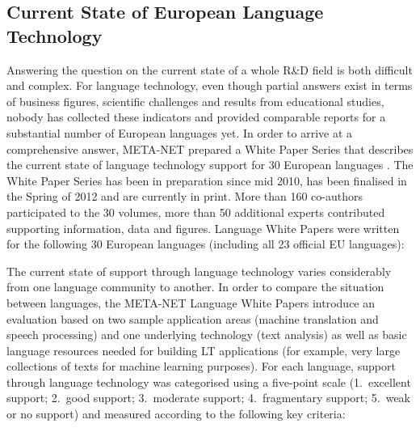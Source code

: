 \documentclass[10pt, plain]{../../metanetpaper}
\begin{document}
\begin{multicols}{2}

\subsection{Current State of European Language Technology}
\label{sec:what-current-state}

Answering the question on the current state of a whole R\&D field is both difficult and complex. For language technology, even though partial answers exist in terms of business figures, scientific challenges and results from educational studies, nobody has collected these indicators and provided comparable reports for a substantial number of European languages yet. In order to arrive at a comprehensive answer, META-NET prepared a White Paper Series that describes the current state of language technology support for 30 European languages \cite{LWP2012}. The White Paper Series has been in preparation since mid 2010, has been finalised in the Spring of 2012 and are currently in print. More than 160 co-authors participated to the 30 volumes, more than 50 additional experts contributed supporting information, data and figures. Language White Papers were written for the following 30 European languages (including all 23 official EU languages):

\medskip
\centerline{}

\medskip 
The current state of support through language technology varies considerably from one language community to another. In order to compare the situation between languages, the META-NET Language White Papers introduce an evaluation based on two sample application areas (machine translation and speech processing) and one underlying technology (text analysis) as well as basic language resources needed for building LT applications (for example, very large collections of texts for machine learning purposes). For each language, support through language technology was categorised using a five-point scale (1.~excellent support; 2.~good support; 3.~moderate support; 4.~fragmentary support; 5.~weak or no support) and measured according to the following key criteria:


\end{multicols}
\end{document}
